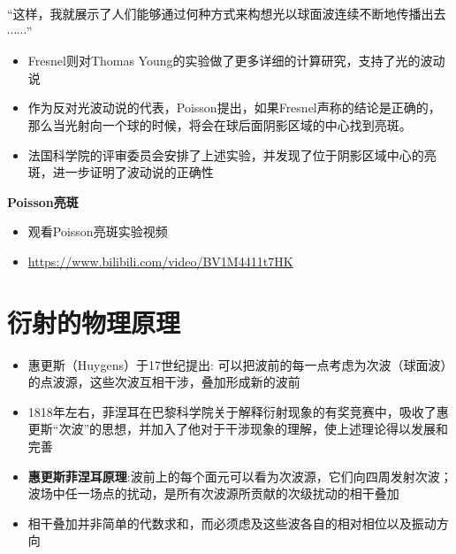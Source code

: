 \begin{slide}
    \begin{shaded}
        {\kaishu “这样，我就展示了人们能够通过何种方式来构想光以球面波连续不断地传播出去$\cdots\cdots$”\\
        }
    \end{shaded}
    \begin{itemize}
        \item Fresnel则对Thomas Young的实验做了更多详细的计算研究，支持了光的波动说
        \item 作为反对光波动说的代表，Poisson提出，如果Fresnel声称的结论是正确的，那么当光射向一个球的时候，将会在球后面阴影区域的中心找到亮斑。
        \item 法国科学院的评审委员会安排了上述实验，并发现了位于阴影区域中心的亮斑，进一步证明了波动说的正确性
    \end{itemize}
\end{slide}

\begin{slide}
    \textbf{Poisson亮斑}
    \begin{itemize}
        \item 观看Poisson亮斑实验视频
        \item \url{https://www.bilibili.com/video/BV1M4411t7HK}
    \end{itemize}
\end{slide}

\section{衍射的物理原理}

\begin{slide}
    \begin{itemize}
        \item 惠更斯（Huygens）于17世纪提出: 可以把波前的每一点考虑为次波（球面波）的点波源，这些次波互相干涉，叠加形成新的波前
        \item 1818年左右，菲涅耳在巴黎科学院关于解释衍射现象的有奖竞赛中，吸收了惠更斯“次波”的思想，并加入了他对于干涉现象的理解，使上述理论得以发展和完善
        \item \textbf{惠更斯菲涅耳原理}:波前上的每个面元可以看为次波源，它们向四周发射次波；波场中任一场点的扰动，是所有次波源所贡献的次级扰动的相干叠加
        \item 相干叠加并非简单的代数求和，而必须虑及这些波各自的相对相位以及振动方向
    \end{itemize}
\end{slide}

